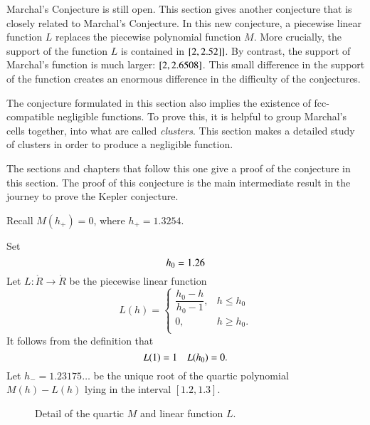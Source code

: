 \begin{summary}  Marchal's Conjecture is still open.  This section gives another conjecture that is closely related to Marchal's Conjecture.  In this new conjecture, a piecewise linear function $L$ replaces the piecewise polynomial function $M$.   More crucially, the support of the function $L$ is contained in $[2,2.52]]$.  By contrast, the support of Marchal's function is much larger: $[2,2.6508]$.
This small difference in the support of the function creates an enormous difference in the difficulty of the conjectures.    

The conjecture formulated in this section also implies the existence of fcc-compatible negligible functions.  To prove this, it is helpful to group Marchal's cells together, into what are called {\it clusters}.  This section makes a detailed study of clusters in order to produce a negligible function.  

 The sections and chapters that follow this one give a proof of the conjecture in this section.  The  proof of this conjecture is the main intermediate result in the journey to prove the Kepler conjecture.
\end{summary}

Recall $M(h_+) = 0$, where   $h_+ = 1.3254$.
%

\begin{definition}[$L$,~$h_0$,~$h_-$]
Set
$$
  h_0 = 1.26\\  %
$$
Let $L:\ring{R}\to\ring{R}$ be the piecewise linear function 
$$
L(h) = \begin{cases}
\dfrac{h_0-h}{h_0-1}, & h \le h_0 \\
0, & h\ge h_0. \\
\end{cases}
$$
It follows from the definition that
$$
L(1) = 1\quad L({h_0}) = 0.
$$
Let $h_- = 1.23175\ldots$ be the unique root of the quartic polynomial
$M(h)-L(h)$ lying in the interval $[1.2,1.3]$.
%
%
%
\end{definition}

\begin{figure}[htb]
  \centering
  \caption{Detail of the quartic $M$ and linear function $L$.}
  \label{fig:L}
\end{figure}


